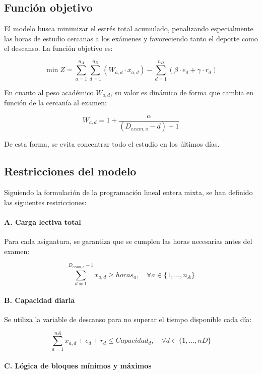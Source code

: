 \documentclass{article}
\begin{document}
\subsection{Función objetivo}

El modelo busca minimizar el estrés total acumulado, penalizando especialmente las horas de estudio cercanas a los exámenes y favoreciendo tanto el deporte como el descanso. La función objetivo es:

\[
\min Z = \sum_{a=1}^{n_A} \sum_{d=1}^{n_D} \left( W_{a,d} \cdot x_{a,d} \right) 
- \sum_{d=1}^{n_D} \left( \beta \cdot e_d + \gamma \cdot r_d \right)
\]

En cuanto al peso académico $W_{a,d}$, su valor es dinámico de forma que cambia en función de la cercanía al examen:

\[
W_{a,d} = 1 + \frac{\alpha}{(D_{exam,a} - d) + 1}
\]

De esta forma, se evita concentrar todo el estudio en los últimos días.

\subsection{Restricciones del modelo}

Siguiendo la formulación de la programación lineal entera mixta, se han definido las siguientes restricciones:

\paragraph{A. Carga lectiva total}

Para cada asignatura, se garantiza que se cumplen las horas necesarias antes del examen:

\[
\sum_{d=1}^{D_{exam,a}-1} x_{a,d} \geq horas_a, 
\quad \forall a \in \{1, \dots, n_A\}
\]

\paragraph{B. Capacidad diaria}
Se utiliza la variable de descanso para no superar el tiempo disponible cada día:

\[
\sum_{a=1}^{nA} x_{a,d} + e_d + r_d \leq Capacidad_d, 
\quad \forall d \in \{1, \dots, nD\}
\]

\paragraph{C. Lógica de bloques mínimos y máximos}
\end{document}

